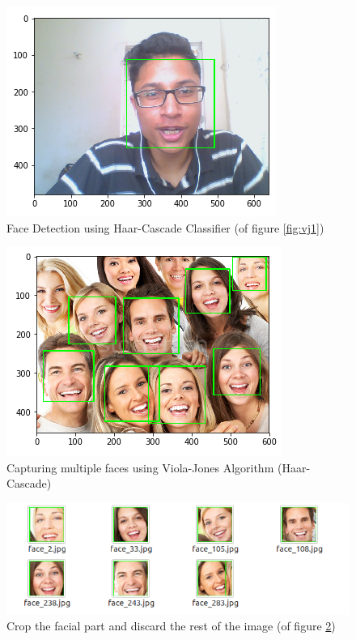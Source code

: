 \begin{figure}[htb]
\centering
\includegraphics[scale=0.5]{images/vj_img2}
\caption{Face Detection using Haar-Cascade Classifier (of figure \ref{fig:vj1})}
\label{fig:vj2}
\end{figure}

\begin{figure}[htb]
\centering
\includegraphics[scale=0.5]{images/vj_img3}
\caption{Capturing multiple faces using Viola-Jones Algorithm (Haar-Cascade)}
\label{fig:vj3}
\end{figure}

\begin{figure}[htb]
\centering
\includegraphics[scale=0.5]{images/vj_img4}
\caption{Crop the facial part and discard the rest of the image (of figure \ref{fig:vj3})}
\label{fig:vj4}
\end{figure}

